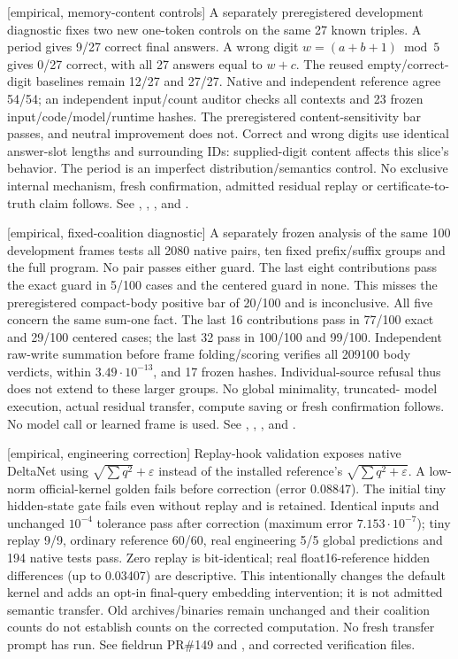 \documentclass[11pt]{article}
\newcommand{\status}[1]{\textsf{[#1]}}
\begin{document}
\status{empirical, memory-content controls} A separately preregistered
development diagnostic fixes two new one-token controls on the same 27
known triples. A period gives 9/27 correct final answers. A wrong digit
$w=(a+b+1)\bmod 5$ gives 0/27 correct, with all 27 answers equal to $w+c$.
The reused empty/correct-digit baselines remain 12/27 and 27/27. Native and
independent reference agree 54/54; an independent input/count auditor
checks all contexts and 23 frozen input/code/model/runtime hashes.
The preregistered content-sensitivity bar passes, and neutral improvement
does not. Correct and wrong digits use identical answer-slot lengths and
surrounding IDs: supplied-digit content affects this slice's behavior.
The period is an imperfect distribution/semantics control. No exclusive
internal mechanism, fresh confirmation, admitted residual replay or
certificate-to-truth claim follows. See
,
, , and .

\status{empirical, fixed-coalition diagnostic} A separately frozen analysis
of the same 100 development frames tests all 2080 native pairs, ten fixed
prefix/suffix groups and the full program. No pair passes either guard.
The last eight contributions pass the exact guard in 5/100 cases and the
centered guard in none. This misses the preregistered compact-body positive
bar of 20/100 and is inconclusive. All five concern the same sum-one fact.
The last 16 contributions pass in 77/100 exact and 29/100 centered cases;
the last 32 pass in 100/100 and 99/100. Independent raw-write summation
before frame folding/scoring verifies all 209100 body verdicts, within
$3.49\cdot10^{-13}$, and 17 frozen hashes. Individual-source refusal thus
does not extend to these larger groups. No global minimality, truncated-
model execution, actual residual transfer, compute saving or fresh
confirmation follows. No model call or learned frame is used. See
,
, , and .

\clearpage
\status{empirical, engineering correction} Replay-hook validation exposes
native DeltaNet using $\sqrt{\sum q^2}+\varepsilon$ instead of the installed
reference's $\sqrt{\sum q^2+\varepsilon}$. A low-norm official-kernel golden
fails before correction (error 0.08847). The initial tiny hidden-state gate
fails even without replay and is retained. Identical inputs and unchanged
$10^{-4}$ tolerance pass after correction (maximum error
$7.153\cdot10^{-7}$); tiny replay 9/9, ordinary reference 60/60, real
engineering 5/5 global predictions and 194 native tests pass. Zero replay
is bit-identical; real float16-reference hidden differences (up to 0.03407)
are descriptive. This intentionally changes the default kernel and adds an
opt-in final-query embedding intervention; it is not admitted semantic
transfer. Old archives/binaries remain unchanged and their coalition counts
do not establish counts on the corrected computation. No fresh transfer
prompt has run. See fieldrun PR\#149 and
,
 and corrected verification files.
\end{document}
